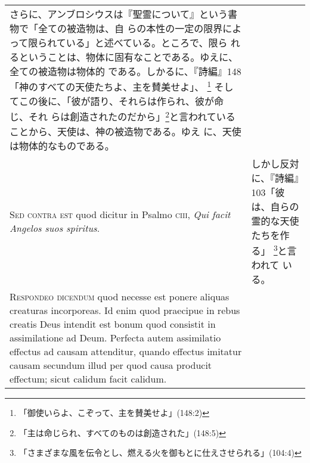 \documentclass[10pt]{jsarticle} %
\begin{document}
\begin{longtable}{p{21em}p{21em}}
さらに、アンブロシウスは『聖霊について』という書物で「全ての被造物は、自
 らの本性の一定の限界によって限られている」と述べている。ところで、限ら
 れるということは、物体に固有なことである。ゆえに、全ての被造物は物体的
 である。しかるに、『詩編』148「神のすべての天使たちよ、主を賛美せよ」、
 \footnote{「御使いらよ、こぞって、主を賛美せよ」(148:2)}
 そしてこの後に、「彼が語り、それらは作られ、彼が命じ、それ
 らは創造されたのだから」\footnote{「主は命じられ、すべてのものは創造された」(148:5)}と言われていることから、天使は、神の被造物である。ゆえ
 に、天使は物体的なものである。

\\


{\scshape Sed contra est} quod dicitur in Psalmo {\scshape ciii},
{\itshape Qui facit Angelos suos spiritus}.


&

しかし反対に、『詩編』103「彼は、自らの霊的な天使たちを作る」
 \footnote{「さまざまな風を伝令とし、燃える火を御もとに仕えさせられる」(104:4)}と言われて
 いる。
\\


{\scshape Respondeo dicendum} quod necesse est ponere
aliquas creaturas incorporeas. Id enim quod praecipue in rebus creatis
Deus intendit est bonum quod consistit in assimilatione ad
Deum. Perfecta autem assimilatio effectus ad causam attenditur, quando
effectus imitatur causam secundum illud per quod causa producit
effectum; sicut calidum facit calidum. 


\end{longtable}
\end{document}
